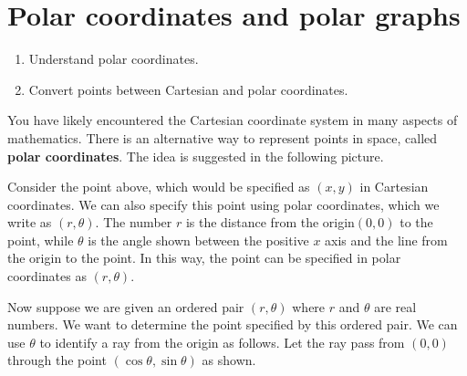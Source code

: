 \section{Polar coordinates and polar graphs}

\begin{outcome}
  \begin{enumerate}
  \item Understand polar coordinates.
  \item Convert points between Cartesian and polar coordinates.
  \end{enumerate}
\end{outcome}

You have likely encountered the Cartesian coordinate system in many aspects of mathematics. There is an alternative way to represent points in space, called \textbf{polar
coordinates}. The idea is suggested in the following picture.

\begin{center}
\end{center}

Consider the point above, which would be specified as $(x,y)$ in Cartesian coordinates. We can also specify this point using polar coordinates, which we write as $(r, \theta)$. The number $r$ is the distance from the origin$(0,0)$ to the point, while $\theta $ is the angle shown
between the positive $x$ axis and the line from the origin to the point. In this way, the point can be specified in polar coordinates as $(r, \theta)$.

Now suppose we are given an ordered pair $(r,\theta) $ where
$r$ and $\theta$ are real numbers. We want to determine the point specified by this ordered pair. We can use $\theta $ to identify a ray
from the origin as follows. Let the ray pass from $(0,0) $
through the point $(\cos \theta ,\sin \theta) $ as shown.

\begin{center}
\end{center}

